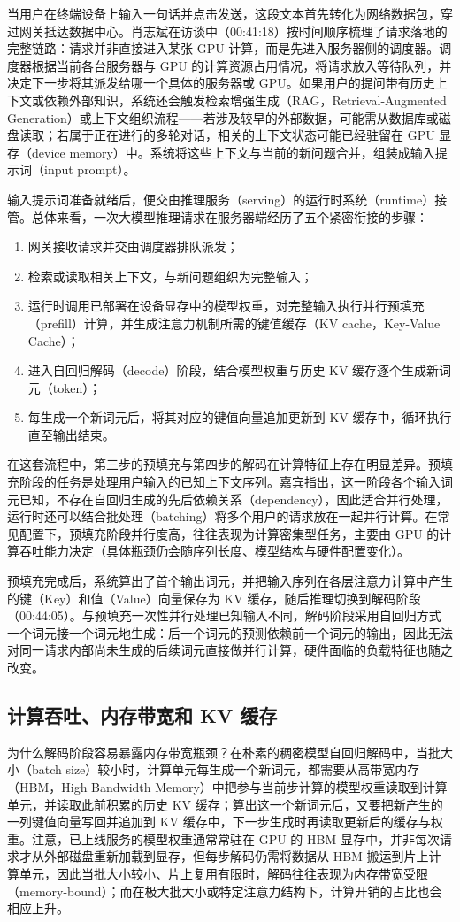 \documentclass[UTF8,a4paper,11pt,fontset=fandol]{ctexart}
\begin{document}
当用户在终端设备上输入一句话并点击发送，这段文本首先转化为网络数据包，穿过网关抵达数据中心。肖志斌在访谈中（00:41:18）按时间顺序梳理了请求落地的完整链路：请求并非直接进入某张 GPU 计算，而是先进入服务器侧的调度器。调度器根据当前各台服务器与 GPU 的计算资源占用情况，将请求放入等待队列，并决定下一步将其派发给哪一个具体的服务器或 GPU。如果用户的提问带有历史上下文或依赖外部知识，系统还会触发检索增强生成（RAG，Retrieval-Augmented Generation）或上下文组织流程——若涉及较早的外部数据，可能需从数据库或磁盘读取；若属于正在进行的多轮对话，相关的上下文状态可能已经驻留在 GPU 显存（device memory）中。系统将这些上下文与当前的新问题合并，组装成输入提示词（input prompt）。

输入提示词准备就绪后，便交由推理服务（serving）的运行时系统（runtime）接管。总体来看，一次大模型推理请求在服务器端经历了五个紧密衔接的步骤：
\begin{enumerate}
\item 网关接收请求并交由调度器排队派发；
\item 检索或读取相关上下文，与新问题组织为完整输入；
\item 运行时调用已部署在设备显存中的模型权重，对完整输入执行并行预填充（prefill）计算，并生成注意力机制所需的键值缓存（KV cache，Key-Value Cache）；
\item 进入自回归解码（decode）阶段，结合模型权重与历史 KV 缓存逐个生成新词元（token）；
\item 每生成一个新词元后，将其对应的键值向量追加更新到 KV 缓存中，循环执行直至输出结束。
\end{enumerate}

在这套流程中，第三步的预填充与第四步的解码在计算特征上存在明显差异。预填充阶段的任务是处理用户输入的已知上下文序列。嘉宾指出，这一阶段各个输入词元已知，不存在自回归生成的先后依赖关系（dependency），因此适合并行处理，运行时还可以结合批处理（batching）将多个用户的请求放在一起并行计算。在常见配置下，预填充阶段并行度高，往往表现为计算密集型任务，主要由 GPU 的计算吞吐能力决定（具体瓶颈仍会随序列长度、模型结构与硬件配置变化）。

预填充完成后，系统算出了首个输出词元，并把输入序列在各层注意力计算中产生的键（Key）和值（Value）向量保存为 KV 缓存，随后推理切换到解码阶段（00:44:05）。与预填充一次性并行处理已知输入不同，解码阶段采用自回归方式一个词元接一个词元地生成：后一个词元的预测依赖前一个词元的输出，因此无法对同一请求内部尚未生成的后续词元直接做并行计算，硬件面临的负载特征也随之改变。

\subsection{计算吞吐、内存带宽和 KV 缓存}
为什么解码阶段容易暴露内存带宽瓶颈？在朴素的稠密模型自回归解码中，当批大小（batch size）较小时，计算单元每生成一个新词元，都需要从高带宽内存（HBM，High Bandwidth Memory）中把参与当前步计算的模型权重读取到计算单元，并读取此前积累的历史 KV 缓存；算出这一个新词元后，又要把新产生的一列键值向量写回并追加到 KV 缓存中，下一步生成时再读取更新后的缓存与权重。注意，已上线服务的模型权重通常常驻在 GPU 的 HBM 显存中，并非每次请求才从外部磁盘重新加载到显存，但每步解码仍需将数据从 HBM 搬运到片上计算单元，因此当批大小较小、片上复用有限时，解码往往表现为内存带宽受限（memory-bound）；而在极大批大小或特定注意力结构下，计算开销的占比也会相应上升。
\end{document}

